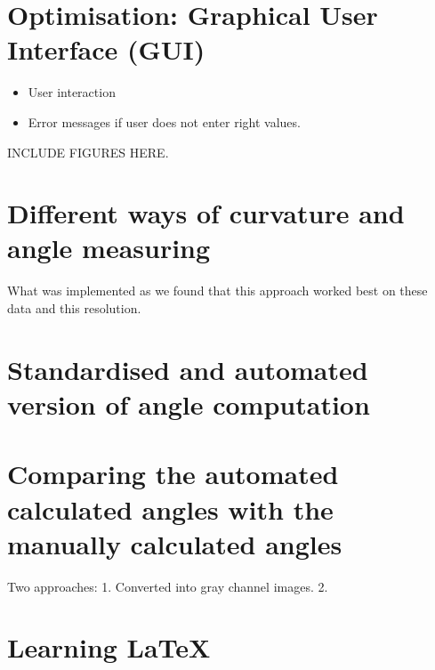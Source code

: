 
\section{Optimisation: Graphical User Interface (GUI)}

\begin{itemize}
	\item User interaction
	\item Error messages if user does not enter right values.
\end{itemize}

INCLUDE FIGURES HERE.


\section{Different ways of curvature and angle measuring}

What was implemented as we found that this approach worked best on these data and this resolution.


\section{Standardised and automated version of angle computation}


\section{Comparing the automated calculated angles with the manually calculated angles}


Two approaches:
1.
Converted into gray channel images.
2.


\section{Learning \LaTeX{}}


